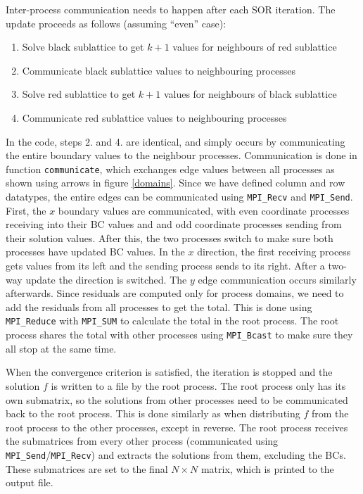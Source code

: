 \documentclass[10pt]{article}
\begin{document}
Inter-process communication needs to happen after each SOR iteration. The update proceeds as follows (assuming ``even'' case):
\begin{enumerate}
\item Solve black sublattice to get $k+1$ values for neighbours of red sublattice
\item Communicate black sublattice values to neighbouring processes
\item Solve red sublattice to get $k+1$ values for neighbours of black sublattice
\item Communicate red sublattice values to neighbouring processes
\end{enumerate}
In the code, steps 2. and 4. are identical, and simply occurs by communicating the entire boundary values to the neighbour processes. Communication is done in function \verb|communicate|, which exchanges edge values between all processes as shown using arrows in figure \ref{domains}. Since we have defined column and row datatypes, the entire edges can be communicated using \verb|MPI_Recv| and \verb|MPI_Send|. First, the $x$ boundary values are communicated, with even coordinate processes receiving into their BC values and and odd coordinate processes sending from their solution values. After this, the two processes switch to make sure both processes have updated BC values. In the $x$ direction, the first receiving process gets values from its left and the sending process sends to its right. After a two-way update the direction is switched. The $y$ edge communication occurs similarly afterwards. Since residuals are computed only for process domains, we need to add the residuals from all processes to get the total. This is done using \verb|MPI_Reduce| with \verb|MPI_SUM| to calculate the total in the root process. The root process shares the total with other processes using \verb|MPI_Bcast| to make sure they all stop at the same time.

When the convergence criterion is satisfied, the iteration is stopped and the solution $f$ is written to a file by the root process. The root process only has its own submatrix, so the solutions from other processes need to be communicated back to the root process. This is done similarly as when distributing $f$ from the root process to the other processes, except in reverse. The root process receives the submatrices from every other process (communicated using \verb|MPI_Send|/\verb|MPI_Recv|) and extracts the solutions from them, excluding the BCs. These submatrices are set to the final $N \times N$ matrix, which is printed to the output file.
\end{document}
